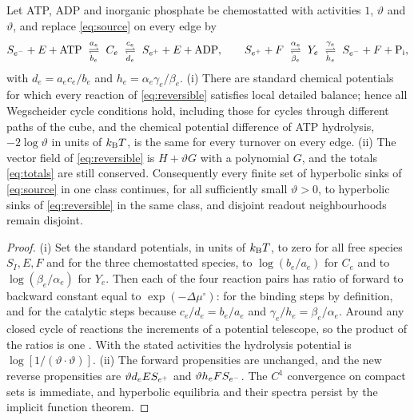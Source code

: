 \begin{theorem}\label{thm:driving}
Let ATP, ADP and inorganic phosphate be chemostatted with activities \(1\), \(\vartheta\) and
\(\vartheta\), and replace \eqref{eq:source} on every edge by
\begin{equation}\label{eq:reversible}
 S_{\tl e}+E+\mathrm{ATP}\ \underset{b_e}{\overset{a_e}{\rightleftharpoons}}\ C_e
 \ \underset{d_e}{\overset{c_e}{\rightleftharpoons}}\ S_{\hd e}+E+\mathrm{ADP},
 \qquad
 S_{\hd e}+F\ \underset{\beta_e}{\overset{\alpha_e}{\rightleftharpoons}}\ Y_e
 \ \underset{h_e}{\overset{\gamma_e}{\rightleftharpoons}}\ S_{\tl e}+F+\mathrm P_{\mathrm i},
\end{equation}
with \(d_e=a_ec_e/b_e\) and \(h_e=\alpha_e\gamma_e/\beta_e\). \textup{(i)} There are standard
chemical potentials for which every reaction of \eqref{eq:reversible} satisfies local
detailed balance; hence all Wegscheider cycle conditions hold, including those for cycles
through different paths of the cube, and the chemical potential difference of ATP hydrolysis,
\(-2\log\vartheta\) in units of \(k_{\mathrm B} T\), is the same for every turnover on every edge.
\textup{(ii)} The vector field of \eqref{eq:reversible} is \(H+\vartheta G\) with a polynomial
\(G\), and the totals \eqref{eq:totals} are still conserved. Consequently every finite set of
hyperbolic sinks of \eqref{eq:source} in one class continues, for all sufficiently small
\(\vartheta>0\), to hyperbolic sinks of \eqref{eq:reversible} in the same class, and disjoint
readout neighbourhoods remain disjoint.
\end{theorem}
\begin{proof}
(i) Set the standard potentials, in units of \(k_{\mathrm B} T\), to zero for all free species
\(S_I,E,F\) and for the three chemostatted species, to \(\log(b_e/a_e)\) for \(C_e\) and to
\(\log(\beta_e/\alpha_e)\) for \(Y_e\). Then each of the four reaction pairs has ratio of
forward to backward constant equal to \(\exp(-\Delta\mu^\circ)\): for the binding steps by
definition, and for the catalytic steps because \(c_e/d_e=b_e/a_e\) and
\(\gamma_e/h_e=\beta_e/\alpha_e\). Around any closed cycle of reactions the increments of a
potential telescope, so the product of the ratios is one \cite{SchusterSchuster1989}. With the
stated activities the hydrolysis potential is \(\log[1/(\vartheta\cdot\vartheta)]\). (ii) The
forward propensities are unchanged, and the new reverse propensities are
\(\vartheta d_eES_{e^{+}}\) and \(\vartheta h_eFS_{e^{-}}\). The \(C^1\) convergence on compact
sets is immediate, and hyperbolic equilibria and their spectra persist by the implicit
function theorem.
\end{proof}

